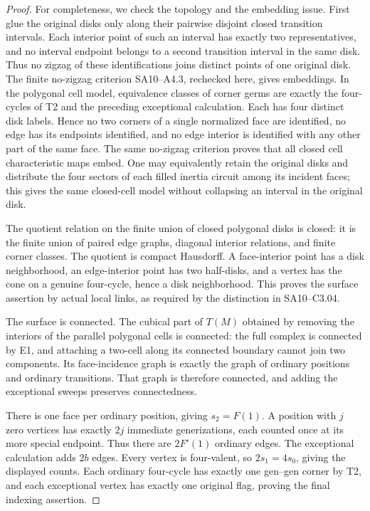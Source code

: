 \begin{proof}
For completeness, we check the topology and the embedding issue.
First glue the original disks only along their pairwise disjoint
closed transition intervals. Each interior point of such an interval
has exactly two representatives, and no interval endpoint belongs
to a second transition interval in the same disk. Thus no zigzag
of these identifications joins distinct points of one original disk.
The finite no-zigzag criterion SA10--A4.3, rechecked here, gives
embeddings. In the polygonal cell model, equivalence classes of corner
germs are exactly the four-cycles of T2 and the preceding exceptional
calculation. Each has four distinct disk labels. Hence no two corners
of a single normalized face are identified, no edge has its endpoints
identified, and no edge interior is identified with any other part
of the same face. The same no-zigzag criterion proves that all closed
cell characteristic maps embed. One may equivalently retain the
original disks and distribute the four sectors of each filled inertia
circuit among its incident faces; this gives the same closed-cell
model without collapsing an interval in the original disk.

The quotient relation on the finite union of closed polygonal disks is
closed: it is the finite union of paired edge graphs, diagonal interior
relations, and finite corner classes. The quotient is compact Hausdorff.
A face-interior point has a disk neighborhood, an edge-interior point
has two half-disks, and a vertex has the cone on a genuine four-cycle,
hence a disk neighborhood. This proves the surface assertion by actual
local links, as required by the distinction in SA10--C3.04.

The surface is connected. The cubical part of $T(M)$ obtained by
removing the interiors of the parallel polygonal cells is connected:
the full complex is connected by E1, and attaching a two-cell along
its connected boundary cannot join two components. Its face-incidence
graph is exactly the graph of ordinary positions and ordinary
transitions. That graph is therefore connected, and adding the
exceptional sweeps preserves connectedness.

There is one face per ordinary position, giving $s_2=F(1)$. A position
with $j$ zero vertices has exactly $2j$ immediate generizations,
each counted once at its more special endpoint. Thus there are
$2F'(1)$ ordinary edges. The exceptional calculation adds $2b$ edges.
Every vertex is four-valent, so $2s_1=4s_0$, giving the displayed
counts. Each ordinary four-cycle has exactly one gen--gen corner by
T2, and each exceptional vertex has exactly one original flag, proving
the final indexing assertion.


\end{proof}
